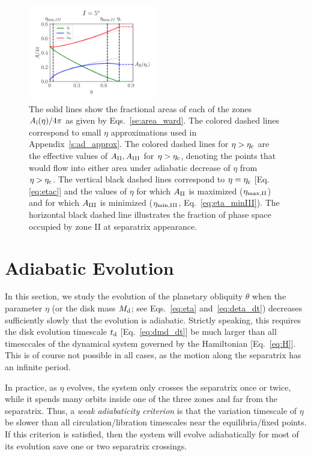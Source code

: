 \documentclass[
        fleqn,
        usenatbib,
    ]{mnras}
\begin{document}
\begin{figure}
    \centering
    \includegraphics[width=0.5\textwidth]{plots_diskdisp/1_areas.png}
    \caption{The solid lines show the fractional areas of each of the zones
    $A_{\rm i}(\eta) / 4\pi$ as given by Eqs.~\eqref{se:area_ward}. The colored
    dashed lines correspond to small $\eta$ approximations used in
    Appendix~\ref{s:ad_approx}. The colored dashed lines for $\eta > \eta_{\rm
    c}$ are the effective values of $A_{\rm II}, A_{\rm III}$ for $\eta >
    \eta_{\rm c}$, denoting the points that would flow into either area under
    adiabatic decrease of $\eta$ from $\eta > \eta_{\rm c}$. The vertical black
    dashed lines correspond to $\eta = \eta_{\rm c}$ [Eq.\eqref{eq:etac}] and
    the values of $\eta$ for which $A_{\rm II}$ is maximized ($\eta_{\rm \max,
    II}$) and for which $A_{\rm III}$ is minimized ($\eta_{\rm \min, III}$,
    Eq.~\eqref{eq:eta_minIII}). The horizontal black dashed line illustrates the
    fraction of phase space occupied by zone II at separatrix appearance.
    }\label{fig:eq_areas}
\end{figure}

\section{Adiabatic Evolution}\label{s:ad}

In this section, we study the evolution of the planetary obliquity $\theta$ when
the parameter $\eta$ (or the disk mass $M_{\rm d}$; see Eqs.~\eqref{eq:eta}
and~\eqref{eq:deta_dt}) decreases sufficiently slowly that the evolution is
adiabatic. Strictly speaking, this requires the disk evolution timescale $t_{\rm
d}$ [Eq.~\eqref{eq:dmd_dt}] be much larger than all timesccales of the dynamical
system governed by the Hamiltonian [Eq.~\eqref{eq:H}]. This is of course not
possible in all cases, as the motion along the separatrix has an infinite
period.

In practice, as $\eta$ evolves, the system only crosses the separatrix once or
twice, while it spends many orbits inside one of the three zones and far from
the separatrix. Thus, a \emph{weak adiabaticity criterion} is that the variation
timescale of $\eta$ be slower than all circulation/libration timescales near the
equilibria/fixed points. If this criterion is satisfied, then the system will
evolve adiabatically for most of its evolution save one or two separatrix
crossings.
\end{document}
